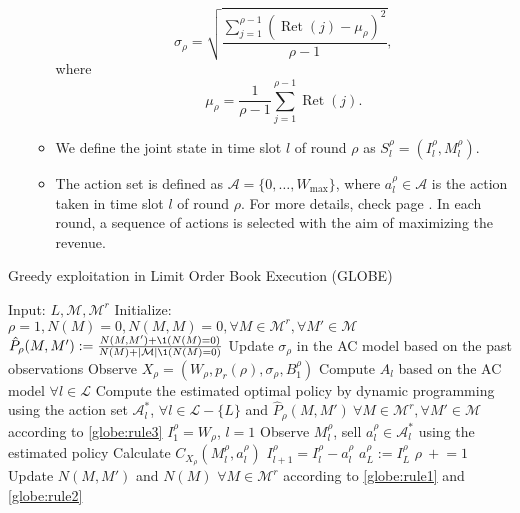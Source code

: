 \begin{enumerate}
\begin{itemize}
\begin{equation*}
                            \sigma_\rho = \sqrt{\frac{\sum_{j=1}^{\rho-1} \left(\operatorname*{Ret}(j) - \mu_\rho\right)^2}{\rho-1}},
                        \end{equation*}
                        where 
                        \begin{equation*}
                            \mu_\rho = \frac{1}{\rho-1}\sum_{j=1}^{\rho-1}\operatorname*{Ret}(j).
                        \end{equation*}
                    \item We define the joint state in time slot $l$ of round $\rho$ as $S_l^\rho = (I_l^\rho, M_l^\rho)$.
                    \item The action set is defined as $\mathcal A = \{0, \dots, W_{\text{max}}\}$, where $a_l^\rho \in \mathcal A$ is the action taken in time slot $l$ of round $\rho$. For more details, check page \pageref{page:actions}. In each round, a sequence of actions is selected with the aim
                    of maximizing the revenue.
                \end{itemize}
            \end{enumerate}

            \begin{algorithm}
                \caption[GLOBE Algorithm]{Greedy exploitation in Limit Order Book Execution (GLOBE)}
                \begin{algorithmic}
                    \State Input: $L, \mathcal{M}, \mathcal{M}^r$
                    \State Initialize: $\rho = 1, N(M)=0, N(M,M)=0, \forall M \in \mathcal{M}^r , \forall M' \in \mathcal{M}$
                        \State $\hat P_\rho (M, M') := \frac{N(M, M') + \1(N(M) = 0)}{N(M) + |\mathcal M| \1 (N(M) = 0)}$
                        \State Update $\sigma_\rho$ in the AC model based on the past observations
                        \State Observe $X_\rho = (W_\rho, p_r(\rho), \sigma_\rho, B_1^\rho)$
                        \State Compute $A_l$ based on the AC model $\forall l \in \mathcal{L}$
                        \State Compute the estimated optimal policy by dynamic programming using the action set $\mathcal A_l^*$, $\forall l \in \mathcal{L} - \{L\}$ and $\hat P_\rho (M, M')\ \forall M \in \mathcal{M}^r, \forall M' \in \mathcal M$ according to \eqref{globe:rule3}
                        \State $I_1^\rho = W_\rho$, $l=1$
                            \State Observe $M_l^\rho$, sell $a_l^\rho\in \mathcal{A}^*_l$ using the estimated policy
                            \State Calculate $C_{X_\rho}(M_l^\rho, a_l^\rho)$
                            \State $I_{l+1}^\rho = I_l^\rho - a_l^\rho$
                        \EndFor
                        \State $a_{L}^\rho := I_L^\rho$
                        \State $\rho\ +\!\!= 1$
                        \State Update $N(M, M')$ and $N(M)$ $\forall M \in \mathcal{M}^r$ according to \eqref{globe:rule1} and \eqref{globe:rule2}
                    \EndWhile
                \end{algorithmic}
                \label{algorithm:GLOBE}
            \end{algorithm}
            

